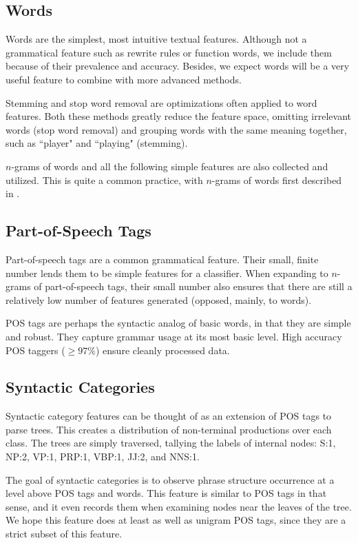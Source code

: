 \documentclass[conference]{IEEEtran}
\begin{document}
\subsection{Words}

Words are the simplest, most intuitive textual features. Although not a
grammatical feature such as rewrite rules or function words, we include them
because of their prevalence and accuracy. Besides, we expect words will be a
very useful feature to combine with more advanced methods.

Stemming and stop word removal are optimizations often applied to word features.
Both these methods greatly reduce the feature space, omitting irrelevant words
(stop word removal) and grouping words with the same meaning together, such as
``player" and ``playing" (stemming).

$n$-grams of words and all the following simple features are also collected and
utilized. This is quite a common practice, with $n$-grams of words first
described in \cite{misc-furnkranz-1998}.

\subsection{Part-of-Speech Tags}

Part-of-speech tags are a common grammatical feature. Their small, finite number
lends them to be simple features for a classifier. When expanding to $n$-grams
of part-of-speech tags, their small number also ensures that there are still a
relatively low number of features generated (opposed, mainly, to words).

POS tags are perhaps the syntactic analog of basic words, in that they are
simple and robust. They capture grammar usage at its most basic level. High
accuracy POS taggers ($\geq97\%$) ensure cleanly processed data.

\subsection{Syntactic Categories}

Syntactic category features can be thought of as an extension of POS tags to
parse trees.  This creates a distribution of non-terminal productions over each
class.  The trees are simply traversed, tallying the labels of internal nodes:
S:1, NP:2, VP:1, PRP:1, VBP:1, JJ:2, and NNS:1.

The goal of syntactic categories is to observe phrase structure occurrence at a
level above POS tags and words. This feature is similar to POS tags in that
sense, and it even records them when examining nodes near the leaves of the
tree. We hope this feature does at least as well as unigram POS tags, since they
are a strict subset of this feature.
\end{document}
